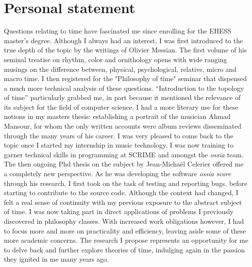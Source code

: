 \documentclass[journal,onecolumn]{IEEEtran}
\begin{document}
\section{Personal statement} %
Questions relating to time have fascinated me since enrolling for the EHESS master's degree. Although I always had an interest, I was first introduced to the true depth of the topic by the writings of Olivier Messian. The first volume of his seminal treatise on rhythm, color and ornithology\cite{messian:ornithology} opens with wide ranging musings on the difference between, physical, psychological, relative, micro and macro time. I then registered for the "Philosophy of time" seminar that  dispensed a much more technical analysis of these questions. ``Introduction to the topology of time''\cite{milliere:topologie} particularly grabbed me, in part because it mentioned the relevance of its subject for the field of computer science. I had a more literary use for these notions in my masters thesis: establishing a portrait of the musician Ahmad Mansour, for whom the only written accounts were album reviews disseminated through the many years of his career. I was very pleased to come back to the topic once I started my internship in music technology. I was now training to garner technical skills in programming at SCRIME and amongst the \textit{ossia} team. The then ongoing Phd thesis on the subject by Jean-Michaël Celerier\cite{jcelerier:thesis} offered me a completely new perspective. As he was developing the software \textit{ossia score} through his research, I first took on the task of testing and reporting bugs, before starting to contribute to the source code. Although the context had changed, I felt a real sense of continuity with my previous exposure to the abstract subject of time. I was now taking part in direct applications of problems I previously discovered in philosophy classes. With increased work obligations however, I had to focus more and more on practicality and efficiency, leaving aside some of these more academic concerns. The research I propose represents an opportunity for me to delve back and further explore theories of time, indulging again in the passion they ignited in me many years ago. 
\end{document}
